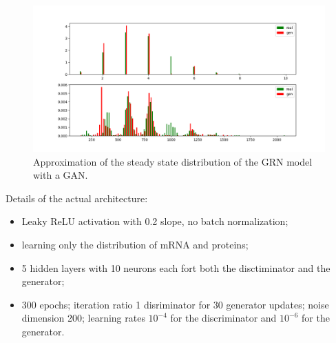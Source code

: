\documentclass{article}
\begin{document}
\begin{figure}
    \centering
    \includegraphics[scale = 0.4]{img/GRN_steady_state.png}
    \caption{Approximation of the steady state distribution of the GRN model with a GAN.}
    \label{fig:GRN_ss}
\end{figure}

Details of the actual architecture: 
\begin{itemize}
    \item Leaky ReLU activation with 0.2 slope, no batch normalization;
    \item learning only the distribution of mRNA and proteins;
    \item 5 hidden layers with 10 neurons each fort both the disctiminator and the generator;
    \item 300 epochs; iteration ratio 1 disriminator for 30 generator updates; noise dimension 200; learning rates $10^{-4}$ for the discriminator and $10^{-6}$ for the generator.
\end{itemize}

%
%
\end{document}
